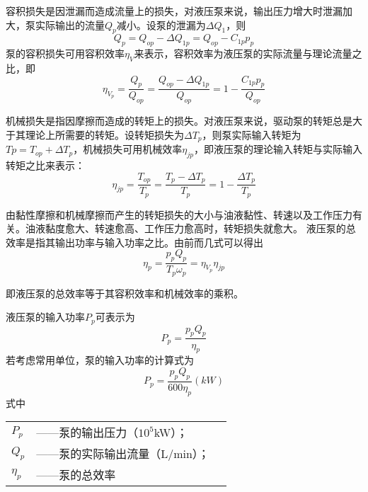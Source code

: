容积损失是因泄漏而造成流量上的损失，对液压泵来说，输出压力增大时泄漏加大，泵实际输出的流量$Q_{p}$减小。设泵的泄漏为${\Delta  }{Q_{1}}$，则
\begin{equation}
  Q_{p}={Q_{op}}-{\Delta  Q_{1p}}={{Q_{op}}-{C_{1p}}{p_{p}}}
\end{equation}
泵的容积损失可用容积效率$\eta_{V}$来表示，容积效率为液压泵的实际流量与理论流量之比，即
\begin{equation}
  \eta _{V_{p}}=\frac{Q_{p}}{Q_{op}}=\frac{{Q_{op}-\Delta Q_{1p} }}{Q_{op}}=1-\frac{{C_{1p}}{p_{p}}}{Q_{op}}
\end{equation}

机械损失是指因摩擦而造成的转矩上的损失。对液压泵来说，驱动泵的转矩总是大于其理论上所需要的转矩。设转矩损失为$\Delta  T_{p}$，则泵实际输入转矩为$T{p}={T_{op}}+\varDelta T_{p}$，机械损失可用机械效率$\eta _{jp}$，即液压泵的理论输入转矩与实际输入转矩之比来表示：
\begin{equation}
  \eta _{jp}=\frac{T_{op}}{T_{p}}=\frac{{T_{p}-{\Delta T_{p}}}}{T_{p}}=1-\frac{\Delta T_{p}}{T_{p}}
\end{equation}

由黏性摩擦和机械摩擦而产生的转矩损失的大小与油液黏性、转速以及工作压力有关。油液黏度愈大、转速愈高、工作压力愈高时，转矩损失就愈大。
液压泵的总效率是指其输出功率与输入功率之比。由前而几式可以得出
\begin{equation}
  \eta _{p}=\frac{p_{p}Q_{p}}{T_{p}\omega_{p}}=\eta_{V_{p}}\eta_{jp}
\end{equation}

即液压泵的总效率等于其容积效率和机械效率的乘积。

液压泵的输入功率$P_{p}$可表示为
\begin{equation}
  P_{p}=\frac{p_{p}Q_{p}}{\eta_{p}}
\end{equation}
若考虑常用单位，泵的输入功率的计算式为
\begin{equation}
  P_{p}=\frac{p_{p}Q_{p}}{600\eta_{p}}(kW)
\end{equation}
\noindent 式中\
\begin{tabular}[t]{lll}
  $P_{p}$ &——泵的输出压力（$10^5$kW）；\\
  $Q_{p}$ &——泵的实际输出流量（L/min）；\\
  $\eta_{p}$ &——泵的总效率
  \end{tabular}

